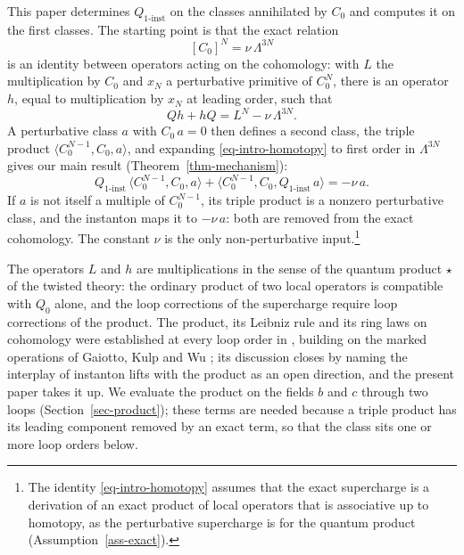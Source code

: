 \documentclass[11pt]{article}
\numberwithin{equation}{section}
\numberwithin{figure}{section}
\numberwithin{table}{section}
\theoremstyle{definition}
\newcommand{\Qi}{Q_{1\text{-}\mathrm{inst}}}
\begin{document}
This paper determines $\Qi$ on the classes annihilated by $C_0$ and computes it on the first classes. The starting point is that the exact relation
\begin{equation}\label{eq-intro-relation}
[C_0]^N=\nu\,\Lambda^{3N}
\end{equation}
is an identity between operators acting on the cohomology: with $L$ the multiplication by $C_0$ and $x_N$ a perturbative primitive of $C_0^N$, there is an operator $h$, equal to multiplication by $x_N$ at leading order, such that
\begin{equation}\label{eq-intro-homotopy}
Qh+hQ=L^N-\nu\,\Lambda^{3N}.
\end{equation}
A perturbative class $a$ with $C_0\,a=0$ then defines a second class, the triple product $\langle C_0^{N-1},C_0,a\rangle$, and expanding \eqref{eq-intro-homotopy} to first order in $\Lambda^{3N}$ gives our main result (Theorem~\ref{thm-mechanism}):
\begin{equation}\label{eq-intro-main}
\Qi\,\langle C_0^{N-1},C_0,a\rangle+\langle C_0^{N-1},C_0,\Qi\,a\rangle=-\nu\,a .
\end{equation}
If $a$ is not itself a multiple of $C_0^{N-1}$, its triple product is a nonzero perturbative class, and the instanton maps it to $-\nu\,a$: both are removed from the exact cohomology. The constant $\nu$ is the only non-perturbative input.\footnote{The identity \eqref{eq-intro-homotopy} assumes that the exact supercharge is a derivation of an exact product of local operators that is associative up to homotopy, as the perturbative supercharge is for the quantum product (Assumption~\ref{ass-exact}).}

The operators $L$ and $h$ are multiplications in the sense of the quantum product $\star$ of the twisted theory: the ordinary product of two local operators is compatible with $Q_0$ alone, and the loop corrections of the supercharge require loop corrections of the product. The product, its Leibniz rule and its ring laws on cohomology were established at every loop order in \cite{LLCh}, building on the marked operations of Gaiotto, Kulp and Wu \cite{higher}; its discussion closes by naming the interplay of instanton lifts with the product as an open direction, and the present paper takes it up. We evaluate the product on the fields $b$ and $c$ through two loops (Section~\ref{sec-product}); these terms are needed because a triple product has its leading component removed by an exact term, so that the class sits one or more loop orders below.
\end{document}
